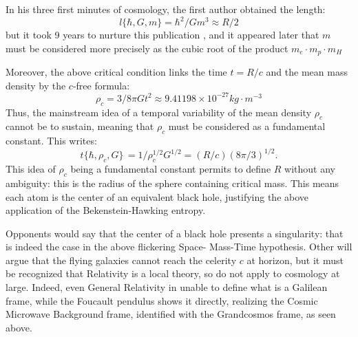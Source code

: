 \documentclass[twoside,draft]{article}
\begin{document}
\begin{sloppypar}
{In his three first minutes of cosmology, the first author obtained the length:
\begin{equation}
l \{\hbar,G,m\} = \hbar^{2} /Gm^{3} \approx R/2
\end{equation}
but it took 9 years to nurture this publication \cite{Sanchez3}, and it appeared later \cite{Sanchez1} that $m$ must be considered more precisely as the cubic root of the product 
$
m_{e} \cdot m_{p} \cdot m_{H}$

Moreover, the above critical condition
links the time $t = R/c$ and the mean mass density by the $c$-free formula:
\begin{equation}
\rho_{c} = 3/8\pi Gt^{2} \approx 9.41198 \times 10^{-27} kg \cdot m^{-3}
\end{equation}
Thus, the mainstream idea of a temporal variability of the mean density $\rho_{c}$ cannot be to
sustain, meaning that $\rho_{c}$ must be considered as a fundamental constant. This writes:
\begin{equation}
t\{\hbar,\rho_{c} ,G\}\, = 1/\rho_{c}^{1/2} G^{1/2} = (R/c) (8\pi/3)^{1/2}.
\end{equation}
This idea of $\rho_{c}$ being a fundamental constant permits to define $R$ without any ambiguity: this is the 
radius of the sphere containing critical mass. This means each atom is the center of an equivalent black hole,
justifying the above application of the Bekenstein-Hawking entropy. 

Opponents would say that the
center of a black hole presents a singularity: that is indeed the case in the above flickering Space-
Mass-Time hypothesis. Other will argue that the flying galaxies cannot reach the celerity $c$ at
horizon, but it must be recognized that Relativity is a local theory, so do not apply to cosmology at large.
Indeed, even General Relativity in unable to define what is a Galilean frame, while the Foucault
pendulus shows it directly, realizing the Cosmic Microwave Background frame, identified with the
Grandcosmos frame, as seen above.

}
\end{sloppypar}
\end{document}
